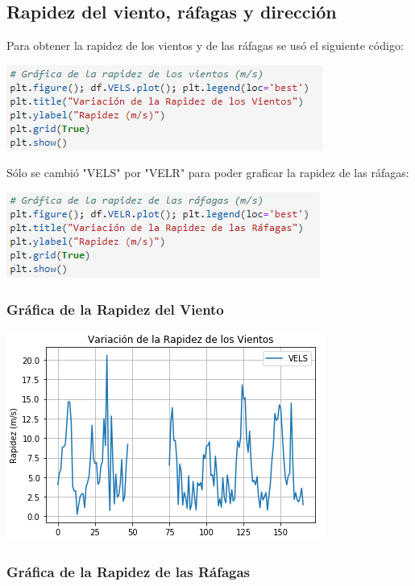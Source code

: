 \documentclass{article}
\begin{document}
\subsection{Rapidez del viento, ráfagas y dirección}

Para obtener la rapidez de los vientos y de las ráfagas se usó el siguiente código:
\begin{center}
    \includegraphics[scale = 1]{Vientos.png}
\end{center}

Sólo se cambió "VELS" por "VELR" para poder graficar la rapidez de las ráfagas:

\begin{center}
    \includegraphics[scale = 1]{Rafagas.png}
\end{center}

\subsubsection{Gráfica de la Rapidez del Viento}

\begin{center}
    \includegraphics[scale = 1]{GVientos.png}
\end{center}

\subsubsection{Gráfica de la Rapidez de las Ráfagas}
\end{document}
